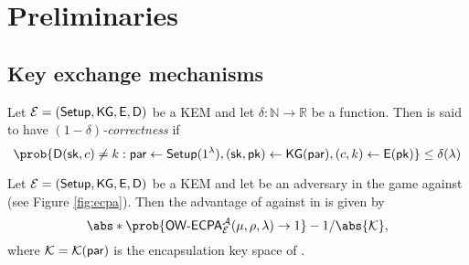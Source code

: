 
\section{Preliminaries}


\subsection{Key exchange mechanisms}


\begin{definition}\label{def:corr}
  Let \(\mathcal{E} = (\mathsf{Setup}, \mathsf{KG}, \mathsf{E}, \mathsf{D})\) be a KEM
  and let \(\delta : \mathbb{N} \to \mathbb{R}\) be a function.
  Then \KEM is said to have \emph{\((1-\delta)\)-correctness} if
  \begin{equation}
    \prob{\Decaps{}(\sk,c) \ne k : \params \assign \Setup{}(1^{\lambda}), (\sk,\pk) \assign \KG{}(\params), (c,k) \assign \Encaps{}(\pk)} \le \delta (\lambda)
  \end{equation}
\end{definition}


\begin{definition}\label{def:OWECPA_sec}
  Let \(\mathcal{E} = (\mathsf{Setup}, \mathsf{KG}, \mathsf{E}, \mathsf{D})\) be a KEM
  and let \advA{} be an adversary in the \OWECPA{} game against \KEM (see Figure \ref{fig:ecpa}).
  Then the advantage of \advA{} against \OWECPA in \KEM is given by
  \begin{equation}
    \abs*{\prob{\OWECPA{}_{\KEM}^{\advA}(\mu,\rho,\lambda) \to 1} - 1/\abs{\keyspace}},
  \end{equation}
  where \(\mathcal{K} = \mathcal{K}{}(\mathsf{par})\) is the encapsulation key space of \KEM.
\end{definition}

